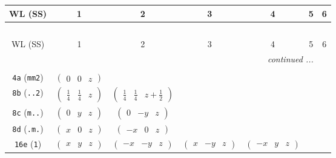 \documentclass[fleqn,9pt,landscape]{jsarticle}
\begin{document}
\begin{center}
\renewcommand{\arraystretch}{1.2}
\begin{longtable}{ccccccc}
 \hline \hline
WL (SS) & 1 & 2 & 3 & 4 & 5 & 6 \\ \hline \endfirsthead

\multicolumn{6}{l}{\tablename\ \thetable{}} \\
 \hline \hline
WL (SS) & 1 & 2 & 3 & 4 & 5 & 6 \\ \hline \endhead

 \hline \hline
\multicolumn{6}{r}{\footnotesize\it continued ...} \\ \endfoot

 \hline \hline
\multicolumn{6}{r}{} \\ \endlastfoot

{\tt 4a} ({\tt mm2}) & $ \begin{pmatrix} 0 & 0 & z \end{pmatrix} $ & $  $ & $  $ & $  $ \\ \hline
{\tt 8b} ({\tt ..2}) & $ \begin{pmatrix} \frac{1}{4} & \frac{1}{4} & z \end{pmatrix} $ & $ \begin{pmatrix} \frac{1}{4} & \frac{1}{4} & z + \frac{1}{2} \end{pmatrix} $ & $  $ & $  $ \\ \hline
{\tt 8c} ({\tt m..}) & $ \begin{pmatrix} 0 & y & z \end{pmatrix} $ & $ \begin{pmatrix} 0 & - y & z \end{pmatrix} $ & $  $ & $  $ \\ \hline
{\tt 8d} ({\tt .m.}) & $ \begin{pmatrix} x & 0 & z \end{pmatrix} $ & $ \begin{pmatrix} - x & 0 & z \end{pmatrix} $ & $  $ & $  $ \\ \hline
{\tt 16e} ({\tt 1}) & $ \begin{pmatrix} x & y & z \end{pmatrix} $ & $ \begin{pmatrix} - x & - y & z \end{pmatrix} $ & $ \begin{pmatrix} x & - y & z \end{pmatrix} $ & $ \begin{pmatrix} - x & y & z \end{pmatrix} $ \\
\end{longtable}
\end{center}
\end{document}
